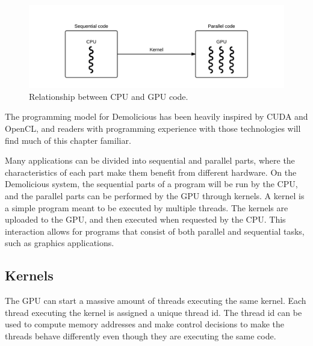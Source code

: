 \documentclass[../main/report.tex]{subfiles}
\begin{document}
\begin{figure}[H]
	\centering
	\includegraphics[width=\textwidth]{../system_overview/diagrams/programming_model_cpu_gpu.png}
	\caption{Relationship between CPU and GPU code.}
	\label{fig:programming_model_cpu_gpu}
\end{figure}

The programming model for Demolicious has been heavily inspired by CUDA and OpenCL, 
and readers with programming experience with those technologies will find much of this chapter familiar.

Many applications can be divided into sequential and parallel parts,
where the characteristics of each part make them benefit from different hardware.
On the Demolicious system, the sequential parts of a program will be run by the CPU, and the parallel parts can be performed by the GPU through kernels.
A kernel is a simple program meant to be executed by multiple threads.
The kernels are uploaded to the GPU, and then executed when requested by the CPU.
This interaction allows for programs that consist of both parallel and sequential tasks, such as graphics applications.

\subsection{Kernels}
The GPU can start a massive amount of threads executing the same kernel.
Each thread executing the kernel is assigned a unique thread id.
The thread id can be used to compute memory addresses and make control decisions
to make the threads behave differently even though they are executing the same code. 

\end{document}

